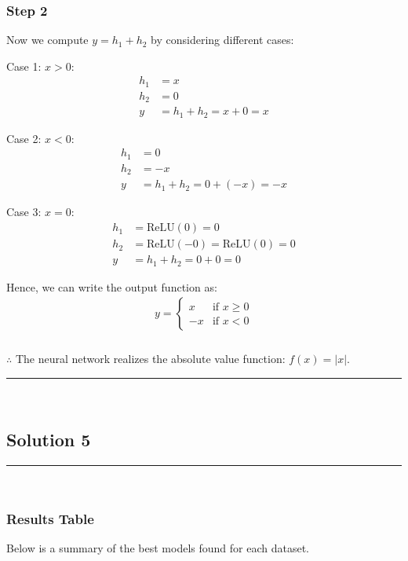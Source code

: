 \documentclass{article}
\begin{document}
\subsubsection*{Step 2}
\parbox{\textwidth}{
Now we compute $y = h_1 + h_2$ by considering different cases:

Case 1: $x > 0$:
\begin{align*}
h_1 &= x \\
h_2 &= 0 \\
y &= h_1 + h_2 = x + 0 = x
\end{align*}

Case 2: $x < 0$:
\begin{align*}
h_1 &= 0 \\
h_2 &= -x \\
y &= h_1 + h_2 = 0 + (-x) = -x
\end{align*}

Case 3: $x = 0$:
\begin{align*}
h_1 &= \text{ReLU}(0) = 0 \\
h_2 &= \text{ReLU}(-0) = \text{ReLU}(0) = 0 \\
y &= h_1 + h_2 = 0 + 0 = 0
\end{align*}

Hence, we can write the output function as:
\begin{align*}
y = \begin{cases}
x & \text{if } x \geq 0 \\
-x & \text{if } x < 0
\end{cases}
\end{align*}
}

\subsubsection*{\normalfont}{$\therefore$ The neural network realizes the absolute value function: $f(x) = |x|$.}

\noindent\rule{\textwidth}{0.4pt}\\

\newpage

\subsection*{Solution 5}
\noindent\rule{\textwidth}{0.4pt}\\

\subsubsection*{Results Table}
\parbox{\textwidth}{
Below is a summary of the best models found for each dataset.
}
\end{document}
